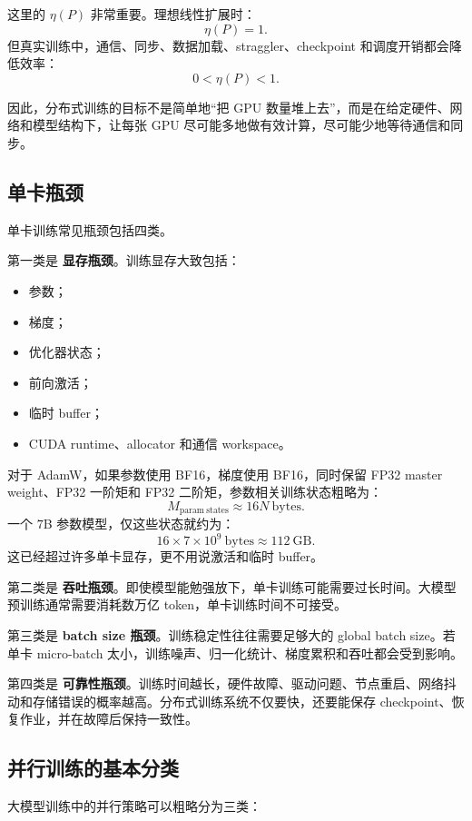 这里的 $\eta(P)$ 非常重要。理想线性扩展时：
\[
\eta(P)=1.
\]
但真实训练中，通信、同步、数据加载、straggler、checkpoint 和调度开销都会降低效率：
\[
0<\eta(P)<1.
\]

因此，分布式训练的目标不是简单地“把 GPU 数量堆上去”，而是在给定硬件、网络和模型结构下，让每张 GPU 尽可能多地做有效计算，尽可能少地等待通信和同步。

\subsection{单卡瓶颈}
\label{subsec:single-gpu-bottlenecks}

单卡训练常见瓶颈包括四类。

第一类是 \textbf{显存瓶颈}。训练显存大致包括：

\begin{itemize}
\item 参数；
\item 梯度；
\item 优化器状态；
\item 前向激活；
\item 临时 buffer；
\item CUDA runtime、allocator 和通信 workspace。
\end{itemize}

对于 AdamW，如果参数使用 BF16，梯度使用 BF16，同时保留 FP32 master weight、FP32 一阶矩和 FP32 二阶矩，参数相关训练状态粗略为：
\[
M_{\mathrm{param\ states}}\approx 16N\ \mathrm{bytes}.
\]
一个 $7$B 参数模型，仅这些状态就约为：
\[
16\times 7\times 10^9\ \mathrm{bytes}
\approx 112\ \mathrm{GB}.
\]
这已经超过许多单卡显存，更不用说激活和临时 buffer。

第二类是 \textbf{吞吐瓶颈}。即使模型能勉强放下，单卡训练可能需要过长时间。大模型预训练通常需要消耗数万亿 token，单卡训练时间不可接受。

第三类是 \textbf{batch size 瓶颈}。训练稳定性往往需要足够大的 global batch size。若单卡 micro-batch 太小，训练噪声、归一化统计、梯度累积和吞吐都会受到影响。

第四类是 \textbf{可靠性瓶颈}。训练时间越长，硬件故障、驱动问题、节点重启、网络抖动和存储错误的概率越高。分布式训练系统不仅要快，还要能保存 checkpoint、恢复作业，并在故障后保持一致性。

\subsection{并行训练的基本分类}
\label{subsec:parallel-training-taxonomy}

大模型训练中的并行策略可以粗略分为三类：

